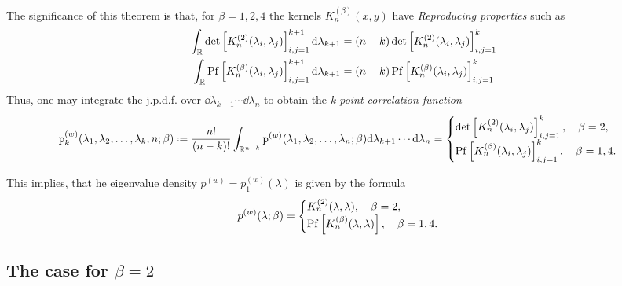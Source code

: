 The significance of this theorem is that, for $\beta = 1, 2, 4$ the kernels $K_n^{(\beta)}(x,y)$ have \textit{Reproducing properties} such as
\begin{align}
	\int_{\mathbb{R}} \det\left[ K_n^{(2)}(\lambda_i, \lambda_j) \right]_{i,j=1}^{k+1} \mathrm{d} \lambda_{k+1} & = (n-k) \det\left[ K_n^{(2)}(\lambda_i, \lambda_j) \right]_{i,j=1}^{k} \\
	\int_{\mathbb{R}} \operatorname{Pf}\left[ K_n^{(\beta)}(\lambda_i, \lambda_j) \right]_{i,j=1}^{k+1} \mathrm{d} \lambda_{k+1} & = (n-k)  \operatorname{Pf}\left[ K_n^{(\beta)}(\lambda_i, \lambda_j) \right]_{i,j=1}^{k}
	\label{Eq: Reproducibility}
\end{align}
Thus, one may integrate the j.p.d.f. over $\dd \lambda_{k+1} \cdots \dd \lambda_n$ to obtain the \textit{k-point correlation function}
\begin{equation}
	\p_k^{(w)}(\mmany{\lambda}{k};n;\beta) \deff \frac{n!}{(n-k)!} \int_{\R^{n-k}} \p^{(w)}(\mmany{\lambda}{n};\beta) \dd \lambda_{k+1} \cdots \dd \lambda_n \\
	=
	\begin{cases}
		\det\left[ K_n^{(2)}(\lambda_i, \lambda_j) \right]_{i,j=1}^{k}, \quad \beta = 2, \\
		\pf\left[ K_n^{(\beta)}(\lambda_i, \lambda_j) \right]_{i,j=1}^{k}, \quad \beta = 1,4.
	\end{cases}
\end{equation}

This implies, that he eigenvalue density $p^{(w)} = p_1^{(w)}(\lambda)$ is given by the formula
\begin{equation}
	p^{(w)}(\lambda; \beta) = 
	\begin{cases}
		K_n^{(2)}(\lambda, \lambda), \quad \beta = 2, \\
		\operatorname{Pf}\left[ K_n^{(\beta)}(\lambda, \lambda) \right], \quad \beta = 1,4.
	\end{cases}
\end{equation}


\subsection{The case for $\beta = 2$}
\label{Subsection: The case for beta 2}

